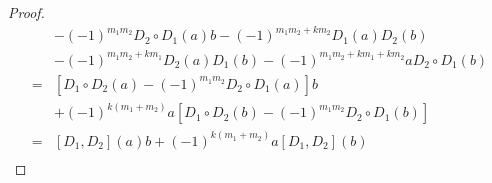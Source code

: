 \documentclass[12pt]{article}
\theoremstyle{definition}
\begin{document}
\begin{proof}
\begin{align*}
		                    & -(-1)^{m_1m_2}D_2 \circ D_1(a)b - (-1)^{m_1m_2 + km_2}D_1(a)D_2(b)                      \\
		                    & - (-1)^{m_1m_2 + km_1}D_2(a)D_1(b) - (-1)^{m_1m_2 + km_1 + km_2}aD_2 \circ D_1(b)                \\
		= {}                & \left[D_1 \circ D_2(a) - (-1)^{m_1m_2}D_2 \circ D_1(a)\right]b                                   \\
                        & + (-1)^{k(m_1 + m_2)}a\left[D_1 \circ D_2(b) - (-1)^{m_1m_2}D_2 \circ D_1(b)\right] \\
    = {}                & [D_1, D_2](a)b + (-1)^{k(m_1 + m_2)}a[D_1, D_2](b) \\
	\end{align*}
\end{proof}
\end{document}

